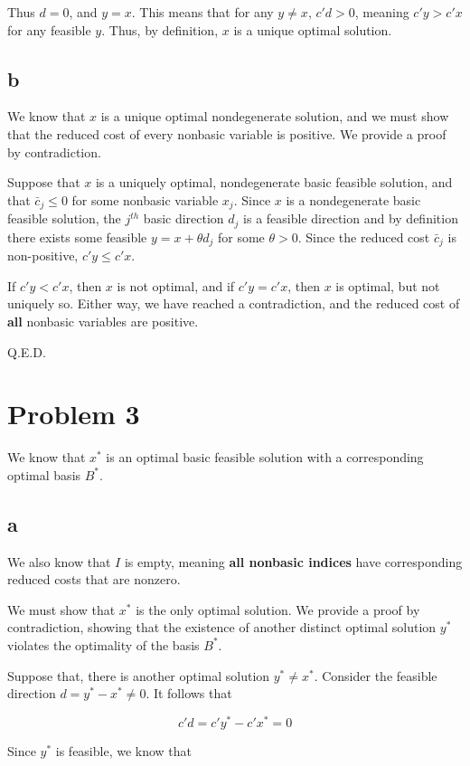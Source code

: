 \documentclass[11pt,a4paper]{article}
\begin{document}
Thus $d=0$, and $y=x$. This means that for any $y\neq x$, $c'd>0$, meaning $c'y>c'x$ for any feasible $y$. Thus, by definition, $x$ is a unique optimal solution.

\subsection{b}

We know that $x$ is a unique optimal nondegenerate solution, and we must show that the reduced cost of every nonbasic variable is positive. We provide a proof by contradiction.

Suppose that $x$ is a uniquely optimal, nondegenerate basic feasible solution, and that $\bar{c}_j\leq 0$ for some nonbasic variable $x_j$. Since $x$ is a nondegenerate basic feasible solution, the $j^{th}$ basic direction $d_j$ is a feasible direction and by definition there exists some feasible $y=x+\theta d_j$ for some $\theta > 0$. Since the reduced cost $\bar{c}_j$ is non-positive, $c'y\leq c'x$.

If $c'y<c'x$, then $x$ is not optimal, and if $c'y=c'x$, then $x$ is optimal, but not uniquely so. Either way, we have reached a contradiction, and the reduced cost of \textbf{all} nonbasic variables are positive. 

Q.E.D.

\section{Problem 3}

We know that $x^*$ is an optimal basic feasible solution with a corresponding optimal basis $B^*$. 

\subsection{a}
We also know that $I$ is empty, meaning \textbf{all nonbasic indices} have corresponding reduced costs that are nonzero. 

We must show that $x^*$ is the only optimal solution. We provide a proof by contradiction, showing that the existence of another distinct optimal solution $y^*$ violates the optimality of the basis $B^*$.

Suppose that, there is another optimal solution $y^*\neq x^*$. Consider the feasible direction $d=y^*-x^*\neq0$. It follows that

$$
c'd=c'y^*-c'x^*=0
$$

Since $y^*$ is feasible, we know that
\end{document}
